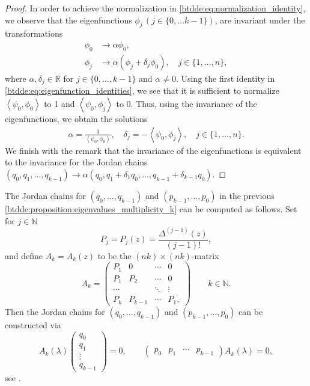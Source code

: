 \begin{proof}
In order to achieve the normalization in \cref{btdde:eq:normalization_identity}, we
observe that the eigenfunctions $\phi_j\, (j\in\{0,\dots k-1\})$, are invariant
under the transformations
\begin{align}
    \phi_0 &\rightarrow \alpha \phi_0, \\
    \phi_j &\rightarrow \alpha (\phi_j + \delta_j \phi_0), \quad j\in\{1,\dots,n\},
\end{align}
where $\alpha, \delta_j \in \mathbb R$ for $j\in\{0,\dots,k-1\}$ and $\alpha \neq 0$.
Using the first identity in \cref{btdde:eq:eigenfunction_identities}, we see that it is sufficient
to normalize $\left< \psi_0, \phi_0 \right>$ to 1 and $\left<\psi_0, \phi_j \right>$ to 0.
Thus, using the invariance of the eigenfunctions, we obtain the solutions
\begin{align*}
    \alpha = \frac{1}{\left< \psi_0, \phi_0 \right>}, \quad
    \delta_j = -\left< \psi_0, \phi_j \right>, \quad j\in\{1,\dots,n\}.
\end{align*}
We finish with the remark that the invariance of the eigenfunctions is equivalent to the invariance
for the Jordan chains $(q_0,q_1, \dots, q_{k-1}) \rightarrow \alpha (q_0,q_1 + \delta_1 q_0, \dots, q_{k-1} + \delta_{k-1} q_0)$.
\end{proof}

\begin{remark}
The Jordan chains for $(q_0,\dots,q_{k-1})$ and $(p_{k-1},\dots,p_0)$ in
the previous \cref{btdde:proposition:eigenvalues_multiplicity_k} can be computed
as follows. Set for $j\in\mathbb N$
\[
    P_j = P_j(z) = \frac{\Delta^{(j-1)}(z)}{(j-1)!},
\]
and define $A_k = A_k(z)$ to be the $(nk)\times(nk)$-matrix
\[
    A_k = \begin{pmatrix}
    P_1 & 0 & \cdots & 0 \\
    P_1 & P_2 & \cdots & 0 \\
    \cdots &  & \ddots & \vdots \\
    P_k & P_{k-1} & \cdots &  P_1,
    \end{pmatrix}
    \qquad k \in \mathbb N.
\]
Then the Jordan chains for $(q_0,\dots,q_{k-1})$ and  $(p_{k-1},\dots,p_0)$ can
be constructed via 
\[
A_k(\lambda)
\begin{pmatrix}
    q_0 \\
    q_1 \\
    \vdots \\
    q_{k-1}
\end{pmatrix} = 0, \qquad
\begin{pmatrix}
    p_0 & p_1 & \cdots & p_{k-1}
\end{pmatrix}
A_k(\lambda) = 0,
\]
see \cite[Chapter IV Exercise 5.11]{diekmann1995delay}.
\end{remark}

